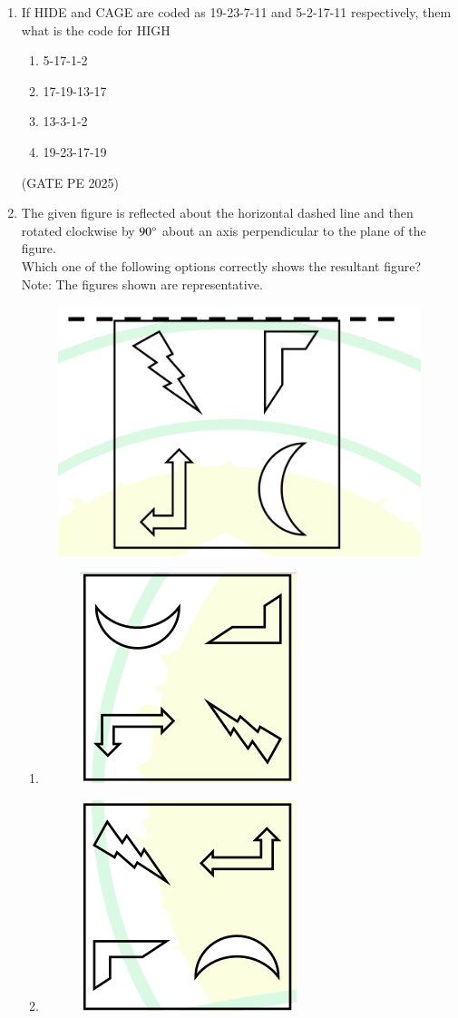 \documentclass[journal,12pt,onecolumn]{IEEEtran}
\theoremstyle{remark}
\begin{document}
\begin{enumerate}
\item If HIDE and CAGE are coded as 19-23-7-11 and 5-2-17-11 respectively, them what is the code for HIGH
\begin{enumerate}
    \item 5-17-1-2
    \item 17-19-13-17
    \item 13-3-1-2
    \item 19-23-17-19
\end{enumerate}
\hfill{(GATE PE 2025)}

\item The given figure is reflected about the horizontal dashed line and then rotated clockwise by $90\degree$ about an axis perpendicular to the plane of the figure.\\
Which one of the following options correctly shows the resultant figure?\\
Note: The figures shown are representative.
\begin{figure}[H]
    \centering
    \includegraphics[width=0.3\columnwidth]{25Q8.png}
    \caption{}
    \label{fig:placeholder}
\end{figure}
\begin{enumerate}
    \item \begin{figure}[H]
    \centering
    \includegraphics[width=0.15\columnwidth]{25Q8_1.png}
    \caption{}
    \label{fig:placeholder}
\end{figure}
    \item \begin{figure}[H]
    \centering
    \includegraphics[width=0.15\columnwidth]{25Q8_2.png}
    \caption{}
    \label{fig:placeholder}
\end{figure}

\end{enumerate}
\end{enumerate}
\end{document}
